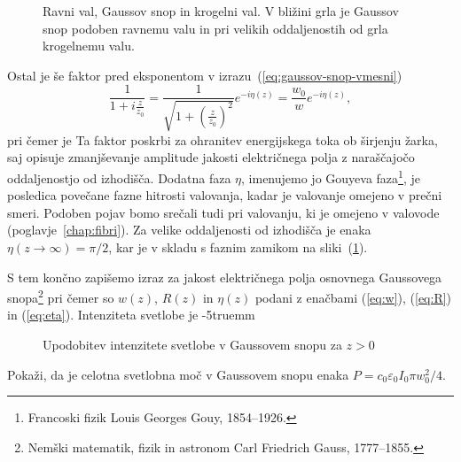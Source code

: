 \begin{figure}[h]
\centering
\def\svgwidth{90truemm} 

\caption{Ravni val, Gaussov snop in
krogelni val. V bližini grla je Gaussov snop podoben ravnemu valu in 
pri velikih oddaljenostih od grla krogelnemu valu.}
\label{fig:ravni-Gaussov-krogelni-val}
\end{figure}

Ostal je  še faktor pred eksponentom v izrazu~(\ref{eq:gaussov-snop-vmesni})
\begin{equation}
\frac{1}{1+i\frac{z}{z_{0}}}=\frac{1}{\sqrt{1+(\frac{z}{z_0})^{2}}}e^{-i\eta(z)}=\frac{w_{0}}{w}e^{-i\eta(z)},
\end{equation}
 pri čemer je
Ta faktor poskrbi za ohranitev energijskega toka ob širjenju žarka, saj opisuje zmanjševanje amplitude
jakosti električnega polja z naraščajočo oddaljenostjo od izhodišča.  
Dodatna faza $\eta$, imenujemo jo Gouyeva 
faza\footnote{Francoski fizik Louis Georges Gouy, 1854--1926.},
je posledica povečane fazne hitrosti valovanja, 
kadar je valovanje omejeno v prečni smeri. Podoben pojav bomo srečali tudi pri valovanju, ki je 
omejeno v valovode (poglavje~\ref{chap:fibri}). Za velike oddaljenosti od izhodišča je enaka $\eta (z\to\infty) = \pi/2$,
kar je v skladu s faznim zamikom na sliki~(\ref{fig:ravni-Gaussov-krogelni-val}).

S tem končno zapišemo izraz za jakost električnega polja osnovnega Gaussovega 
snopa\footnote{Nemški matematik, fizik in astronom Carl Friedrich Gauss, 1777--1855.}
pri čemer so $w(z)$, $R(z)$ in $\eta(z)$ podani z enačbami (\ref{eq:w}), (\ref{eq:R}) in (\ref{eq:eta}).
Intenziteta svetlobe je 
\vglue-5truemm
\begin{figure}[h]
\centering
\def\svgwidth{100truemm} 

\caption{Upodobitev intenzitete svetlobe v Gaussovem snopu za $z>0$ }
\label{fig:Gauss_3D}
\end{figure}

\begin{definition}
\label{naloga-širina-snopa}
Pokaži, da je celotna svetlobna moč v Gaussovem snopu 
enaka 
$P = c_0 \varepsilon_0 I_0 \pi w_0^2/4$.
\end{definition}

